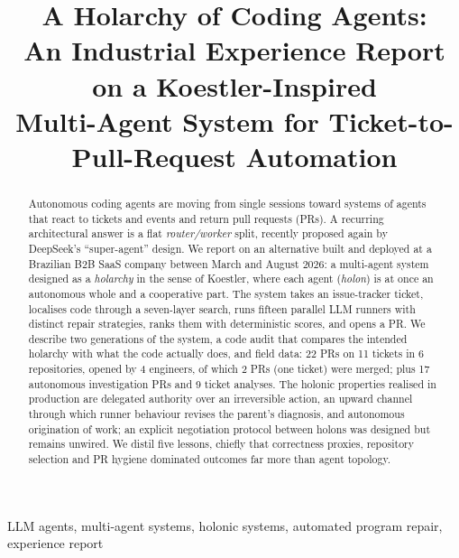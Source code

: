 \documentclass[conference]{IEEEtran}
\begin{document}
\title{A Holarchy of Coding Agents:\\
An Industrial Experience Report on a Koestler-Inspired\\
Multi-Agent System for Ticket-to-Pull-Request Automation}

\author{
}

\maketitle

\begin{abstract}
Autonomous coding agents are moving from single sessions toward systems of
agents that react to tickets and events and return pull requests (PRs). A
recurring architectural answer is a flat \emph{router/worker} split, recently
proposed again by DeepSeek's ``super-agent'' design. We report on an
alternative built and deployed at a Brazilian B2B SaaS company between March
and August 2026: a multi-agent system designed as a \emph{holarchy} in the
sense of Koestler, where each agent (\emph{holon}) is at once an autonomous
whole and a cooperative part. The system takes an issue-tracker ticket,
localises code through a seven-layer search, runs fifteen parallel LLM
runners with distinct repair strategies, ranks them with deterministic
scores, and opens a PR. We describe two generations of the system, a code
audit that compares the intended holarchy with what the code actually does,
and field data: 22 PRs on 11 tickets in 6 repositories, opened by 4
engineers, of which 2 PRs (one ticket) were merged; plus 17 autonomous
investigation PRs and 9 ticket analyses. The holonic properties realised
in production are delegated authority over an irreversible action, an
upward channel through which runner behaviour revises the parent's
diagnosis, and autonomous origination of work; an explicit negotiation
protocol between holons was designed but remains unwired. We distil five
lessons, chiefly that correctness proxies, repository selection
and PR hygiene dominated outcomes far more than agent topology.
\end{abstract}

\begin{IEEEkeywords}
LLM agents, multi-agent systems, holonic systems, automated program repair, experience report
\end{IEEEkeywords}
\end{document}

